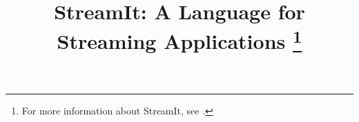 \documentclass[10pt]{article}
\begin{document}
\title{StreamIt: A Language for Streaming Applications%
\thanks{For more information about StreamIt, see \streamiturl.}}


\maketitle
\thispagestyle{empty}


\begin{abstract}

\end{abstract}
\end{document}
